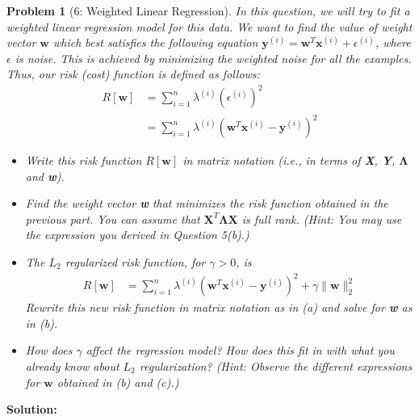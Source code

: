 \documentclass[11pt]{exam}
\theoremstyle{quest}
\newtheorem*{question}{Problem}
\begin{document}
\begin{question}[6: Weighted Linear Regression]
In this question, we will try to fit a weighted linear regression model for this
data. We want to find the value of weight vector $\textbf{w}$ which best
satisfies the following equation
$\textbf{y}^{(i)}=\textbf{w}^T\textbf{x}^{(i)}+\epsilon^{(i)}$, where $\epsilon$
is noise. This is achieved by minimizing the weighted noise for all the
examples. Thus, our risk (cost) function is defined as follows:
\begin{align*}
  R[\textbf{w}] &= \sum_{i=1}^{n} \lambda^{(i)}(\epsilon^{(i)})^2\\
                &= \sum_{i=1}^{n} \lambda^{(i)}(\textbf{w}^T\textbf{x}^{(i)}-\textbf{y}^{(i)})^2
\end{align*}
\begin{itemize}
\item[(a)] Write this risk function $R[\textbf{w}]$ in matrix notation (i.e., in
  terms of \textbf{X}, \textbf{Y}, $\boldsymbol{\Lambda}$ and \textbf{w}).
\item[(b)] Find the weight vector \textbf{w} that minimizes the risk function
  obtained in the previous part. You can assume that
  $\textbf{X}^T\boldsymbol{\Lambda}\textbf{X}$ is full rank. (Hint: You may use
  the expression you derived in Question 5(b).)
\medskip
\item[(c)] The $L_2$ regularized risk function, for $\gamma>0$, is
  \begin{align*}
    R[\textbf{w}] &= \sum_{i=1}^{n} \lambda^{(i)}(\textbf{w}^T\textbf{x}^{(i)}-\textbf{y}^{(i)})^2 + \gamma \|\textbf{w}\|^2_2
  \end{align*}
  Rewrite this new risk function in matrix notation as in (a) and solve for
  \textbf{w} as in (b).
\item[(d)] How does $\gamma$ affect the regression model? How does this fit in
  with what you already know about $L_2$ regularization? (Hint: Observe
  the different expressions for $\textbf{w}$ obtained in (b) and (c).)
\end{itemize}
\end{question}
\textbf{Solution:}
\end{document}

